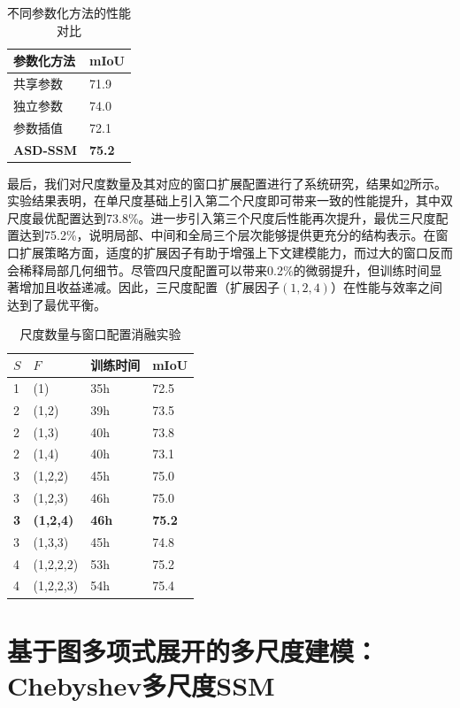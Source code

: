 \documentclass[12pt,a4paper,openany,oneside]{ctexbook}
\theoremstyle{definition}
\theoremstyle{remark}
\begin{document}
\begin{table}[htbp!]
	\centering
	\caption{不同参数化方法的性能对比}
	\label{tab:parameterization_comparison}
	\begin{tabular}{@{}ll@{}}
		\toprule
		参数化方法 & mIoU \\
		\midrule
		共享参数 & 71.9 \\
		独立参数 & 74.0 \\
		参数插值 & 72.1 \\
		\textbf{ASD-SSM} & \textbf{75.2} \\
		\bottomrule
	\end{tabular}
\end{table}



最后，我们对尺度数量及其对应的窗口扩展配置进行了系统研究，结果如\cref{tab:scale_number}所示。实验结果表明，在单尺度基础上引入第二个尺度即可带来一致的性能提升，其中双尺度最优配置达到73.8\%。进一步引入第三个尺度后性能再次提升，最优三尺度配置达到75.2\%，说明局部、中间和全局三个层次能够提供更充分的结构表示。在窗口扩展策略方面，适度的扩展因子有助于增强上下文建模能力，而过大的窗口反而会稀释局部几何细节。尽管四尺度配置可以带来0.2\%的微弱提升，但训练时间显著增加且收益递减。因此，三尺度配置（扩展因子$(1, 2, 4)$）在性能与效率之间达到了最优平衡。

\begin{table}[htbp!]
	\centering
	\caption{尺度数量与窗口配置消融实验}
	\label{tab:scale_number}
	\begin{tabular}{@{}llll@{}}
		\toprule
		$S$ & $F$ & 训练时间 & mIoU \\
		\midrule
		1 & (1) & 35h & 72.5 \\
		2 & (1,2) & 39h & 73.5 \\
		2 & (1,3) & 40h & 73.8 \\
		2 & (1,4) & 40h & 73.1 \\
		3 & (1,2,2) & 45h & 75.0 \\
		3 & (1,2,3) & 46h & 75.0 \\
		\textbf{3} & \textbf{(1,2,4)} & \textbf{46h} & \textbf{75.2} \\
		3 & (1,3,3) & 45h & 74.8 \\
		4 & (1,2,2,2) & 53h & 75.2 \\
		4 & (1,2,2,3) & 54h & 75.4 \\
		\bottomrule
	\end{tabular}
\end{table}

\section{基于图多项式展开的多尺度建模：Chebyshev多尺度SSM}
\end{document}
